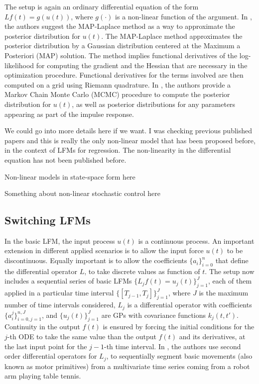 \documentclass[journal]{IEEEtran}
\newcommand{\mauricio}[1]{{\color{blue}#1}}
\newcommand{\simo}[1]{{\color{red}#1}}
\begin{document}
The setup is again an ordinary differential equation of the form $Lf(t)=g(u(t))$, where $g(\cdot)$ is a non-linear function
of the argument. In \cite{Lawrence:gpsim2007a, Gao:latent08}, the authors suggest the MAP-Laplace method
\cite{Bishop:PRML06} as a way to approximate the posterior distribution for $u(t)$. The MAP-Laplace method approximates
the posterior distribution by a
Gaussian distribution centered at the Maximum a Posteriori (MAP) solution. The method implies functional derivatives of the
log-likelihood for computing the gradient and the Hessian that are necessary in the optimization procedure. Functional
derivatives for the terms involved are then computed on a grid using Riemann quadrature. In \cite{Titsias:BMC:2012}, the
authors provide a Markov Chain Monte Carlo (MCMC) procedure to compute the posterior distribution for $u(t)$, as well
as posterior distributions for any parameters appearing as part of the impulse response.

\mauricio{We could go into more details here if we want. I was checking previous published papers and this is really
the only non-linear model that has been proposed before, in the context of LFMs for regression. The non-linearity in the
differential equation has not been published before}.


\simo{Non-linear models in state-space form here}

\simo{Something about non-linear stochastic control here}


\subsection{Switching LFMs}

In the basic LFM, the input process $u(t)$ is a continuous process. An important extension in different applied scenarios
is to allow the input force $u(t)$ to be discontinuous. Equally important is to allow the coefficients $\{a_i\}_{i=0}^n$ that
define the differential operator $L$, to take discrete values as function of $t$. The setup now includes a sequential
series of basic LFMs $\{L_jf(t) = u_j(t)\}_{j=1}^J$, each of them applied in a particular time interval
$\{[T_{j-1}, T_j]\}_{j=1}^J$, where $J$ is the maximum number of time intervals considered, $L_j$ is a differential operator
with coefficients $\{a_i^j\}_{i=0,j=1}^{n, J}$, and $\{u_j(t)\}_{j=1}^J$ are GPs with covariance functions $k_j(t,t')$.
Continuity in the output $f(t)$ is ensured by forcing the initial conditions for the $j$-th ODE to take the same value
than the output $f(t)$ and its derivatives, at the last input point for the $j-1$-th time interval.
In \cite{Alvarez:switched11}, the authors use second order differential operators for $L_j$, to sequentially segment
basic movements (also known as motor primitives) from a multivariate time series coming from a robot arm playing table
tennis.
\end{document}
